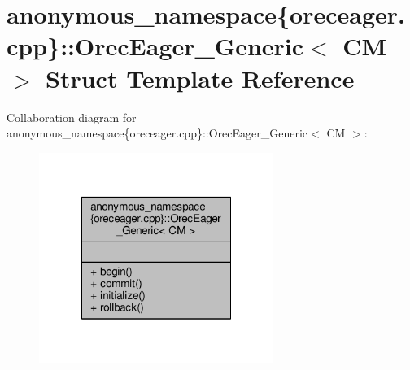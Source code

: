 \hypertarget{structanonymous__namespace_02oreceager_8cpp_03_1_1OrecEager__Generic}{\section{anonymous\-\_\-namespace\{oreceager.\-cpp\}\-:\-:Orec\-Eager\-\_\-\-Generic$<$ C\-M $>$ Struct Template Reference}
\label{structanonymous__namespace_02oreceager_8cpp_03_1_1OrecEager__Generic}
}


Collaboration diagram for anonymous\-\_\-namespace\{oreceager.\-cpp\}\-:\-:Orec\-Eager\-\_\-\-Generic$<$ C\-M $>$\-:
\nopagebreak
\begin{figure}[H]
\begin{center}
\leavevmode
\includegraphics[width=216pt]{structanonymous__namespace_02oreceager_8cpp_03_1_1OrecEager__Generic__coll__graph}
\end{center}
\end{figure}
